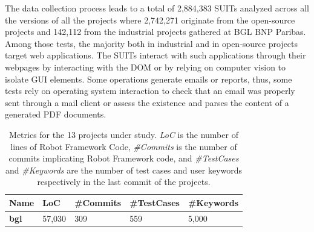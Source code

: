 The data collection process leads to a total of 2,884,383 SUITs analyzed across all the versions of all the projects where 2,742,271 originate from the open-source projects and 142,112 from the industrial projects gathered at BGL BNP Paribas. Among those tests, the majority both in industrial and in open-source projects target web applications. The SUITs interact with such applications through their webpages by interacting with the DOM or by relying on computer vision to isolate GUI elements. Some operations generate emails or reports, thus, some tests rely on operating system interaction to check that an email was properly sent through a mail client or assess the existence and parses the content of a generated PDF documents.

\begin{table}
\centering

\caption{Metrics for the 13 projects under study. \emph{LoC} is the number of lines of Robot Framework Code, \emph{\#Commits} is the number of commits implicating Robot Framework code, and \emph{\#TestCases} and \emph{\#Keywords} are the number of test cases and user keywords respectively in the last commit of the projects.}
\label{tab:projects}

\begin{tabular}{>{\raggedright}p{0.9in}>{\raggedleft}p{0.7in}>{\raggedleft}p{0.7in}>{\raggedleft}p{0.7in}>{\raggedleft}p{0.7in}}

\toprule
\scriptsize{\textbf{Name}} & \scriptsize{\textbf{LoC}} & \scriptsize{\textbf{\#Commits}} & \scriptsize{\textbf{\#TestCases}} & \scriptsize{\textbf{\#Keywords}} \tabularnewline
\toprule

\scriptsize{\textbf{bgl}} & \scriptsize{57,030} & \scriptsize{309} & \scriptsize{559} & \scriptsize{5,000} \tabularnewline

\midrule


\end{tabular}
\end{table}
